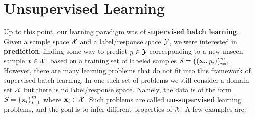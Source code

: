 \chapter{Unsupervised Learning}
Up to this point, our learning paradigm was of \textbf{supervised batch learning}. Given a sample space $\mathcal{X}$ and a label/response space $\mathcal{Y}$, we were interested in \textbf{prediction}: finding some way to predict $y\in\mathcal{Y}$ corresponding to a new unseen sample $x\in\mathcal{X}$, based on a training set of labeled samples $S=\left\{\left(\mathbf{x}_i,y_i\right)\right\}^m_{i=1}$. However, there are many learning problems that do not fit into this framework of supervised batch learning. In one such set of problems we still consider a domain set $\mathcal{X}$ but there is no label/response space. Namely, the data is of the form $S=\left\{\mathbf{x}_i\right\}^m_{i=1}$ where $\mathbf{x}_i\in\mathcal{X}$. Such problems are called \textbf{un-supervised} learning problems, and the goal is to infer different properties of $\mathcal{X}$. A few examples are:\\
